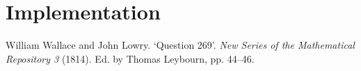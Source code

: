 \documentclass[a4paper,UKenglish]{lipics-v2016}
\begin{document}
\section{Implementation}




%


\nocite{Simpson}

\begin{thebibliography}{50}
William Wallace and John Lowry. ‘Question 269’. \textit{New Series of the Mathematical Repository 3} (1814). Ed. by Thomas Leybourn, pp. 44–46.
\end{thebibliography}
\end{document}
